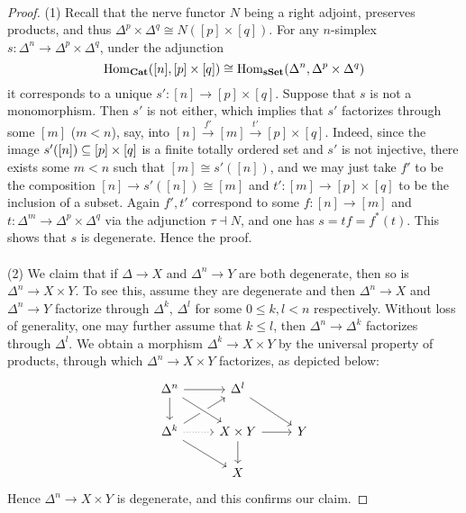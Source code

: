 \documentclass[a4paper,11pt,openany]{scrartcl}
\begin{document}
~\\
\begin{proof}
(1) Recall that the nerve functor $N$ being a right adjoint, preserves products, and thus $\Delta^p\times\Delta^q\cong N([p]\times[q])$. For any $n$-simplex $s\colon\Delta^n\to\Delta^p\times\Delta^q$, under the adjunction
\[
\operatorname{Hom}_{\operatorname{\mathbf{Cat}}}([n],[p]\times[q])\cong\operatorname{Hom}_{\operatorname{\mathbf{sSet}}}(\Delta^n,\Delta^p\times\Delta^q)
\]
it corresponds to a unique $s'\colon[n]\to[p]\times[q]$. Suppose that $s$ is not a monomorphism. Then $s'$ is not either, which implies that $s'$ factorizes through some $[m]$ ($m<n$), say, into $[n]\overset{f'}{\to}[m]\overset{t'}{\to}[p]\times[q]$. Indeed, since the image $s'([n])\subseteq[p]\times[q]$ is a finite totally ordered set and $s'$ is not injective, there exists some $m<n$ such that $[m]\cong s'([n])$, and we may just take $f'$ to be the composition $[n]\to s'([n])\cong[m]$ and $t'\colon[m]\to[p]\times[q]$ to be the inclusion of a subset. Again $f',t'$ correspond to some $f\colon[n]\to[m]$ and $t\colon\Delta^m\to\Delta^p\times\Delta^q$ via the adjunction $\tau\dashv N$, and one has $s=tf=f^*(t)$. This shows that $s$ is degenerate. Hence the proof.\\
\\
(2) We claim that if $\Delta\to X$ and $\Delta^n\to Y$ are both degenerate, then so is $\Delta^n\to X\times Y$. To see this, assume they are degenerate and then $\Delta^n\to X$ and $\Delta^n\to Y$ factorize through $\Delta^k$, $\Delta^l$ for some $0\leqslant k,l<n$ respectively. Without loss of generality, one may further assume that $k\leqslant l$, then $\Delta^n\to\Delta^k$ factorizes through $\Delta^l$. We obtain a morphism $\Delta^k\to X\times Y$ by the universal property of products, through which $\Delta^n\to X\times Y$ factorizes, as depicted below:
\[
\begin{tikzcd}
\Delta^n\arrow[r]\arrow[d]& \Delta^l\arrow[dr]\arrow[from=dl]&\\
\Delta^k\arrow[dr]\arrow[r,dotted]& X\times Y\arrow[r]\arrow[d]\arrow[from=ul,crossing over]& Y\\
& X&
\end{tikzcd}
\]
Hence $\Delta^n\to X\times Y$ is degenerate, and this confirms our claim.


\end{proof}
\end{document}
